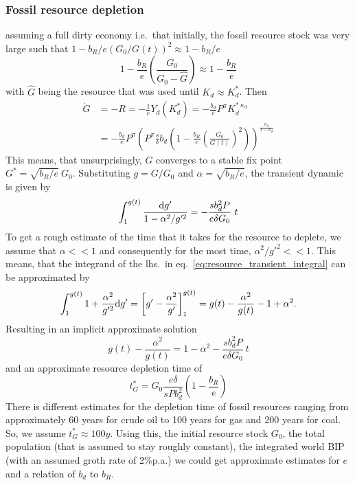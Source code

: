 \subsubsection{Fossil resource depletion}
assuming a full dirty economy i.e.\ that initially, the fossil resource stock was very large such that $1-b_R/e (G_0/G(t))^{2} \approx 1-b_R/e$
\begin{equation}
	1-\frac{b_R}{e}\left( \frac{G_0}{G_0 - \hat{G}} \right) \approx 1-\frac{b_R}{e}
	\label{eq:resource_cost_approx}
\end{equation}
with $\hat{G}$ being the resource that was used until $K_d \approx K^{*}_d$. Then
\begin{align}
	\dot{G} &= -R = -\frac{1}{e}Y_d(K^*_d) = -\frac{b_d}{e}P^{\pi}K_d^{*\ \kappa_d} \\
	&= - \frac{b_d}{e}P^{\pi}\left(P^{\pi} \frac{s}{\delta}b_d\left( 1-\frac{b_R}{e}\left( \frac{G_0}{G(t)} \right)^2 \right) \right)^{\frac{\kappa_d}{1-\kappa_d}}
	\label{eq:resource_deprec_approx}
\end{align}
This means, that unsurprisingly, $G$ converges to a stable fix point $G^* = \sqrt{b_R/e}\ G_0$. Substituting $g = G/G_0$ and $\alpha = \sqrt{b_R/e}$, the transient dynamic is given by
\begin{equation}
	\int_1^{g(t)} \frac{{\rm d} g'}{1 - \alpha^2/g'^2} = - \frac{s b_d^2 P}{e \delta G_0} \ t
	\label{eq:resource_transient_integral}
\end{equation}
To get a rough estimate of the time that it takes for the resource to deplete, we assume that $\alpha << 1$ and consequently for the most time, $\alpha^2/g'^2 << 1$.
This means, that the integrand of the lhs.\ in eq.~\eqref{eq:resource_transient_integral} can be approximated by
\begin{equation}
	\int_1^{g(t)}1+\frac{\alpha^2}{g'^2} {\rm d}g' = \left[ g' - \frac{\alpha^2}{g'} \right]_1^{g(t)} = g(t) - \frac{\alpha^2}{g(t)} -1+\alpha^2.
	\label{eq:resource_transient_solution}
\end{equation}
Resulting in an implicit approximate solution
\begin{equation}
	g(t) - \frac{\alpha^2}{g(t)} = 1 -\alpha^2 - \frac{s b_d^2 P}{e \delta G_0} \ t
	\label{eq:resource_transient_solution2}
\end{equation}
and an approximate resource depletion time of
\begin{equation}
	t^*_G = G_0\frac{e \delta}{s P b_d^2}\left( 1-\frac{b_R}{e} \right)
	\label{eq:resource_depletion_time}
\end{equation}
There is different estimates for the depletion time of fossil resources ranging from approximately 60 years for crude oil to 100 years for gas and 200 years for coal.
So, we assume $t^*_G \approx 100y$. Using this, the initial resource stock $G_0$, the total population (that is assumed to stay roughly constant), the integrated world BIP (with an assumed groth rate of 2\%p.a.) we could get approximate estimates for $e$ and a relation of $b_d$ to  $b_R$.

